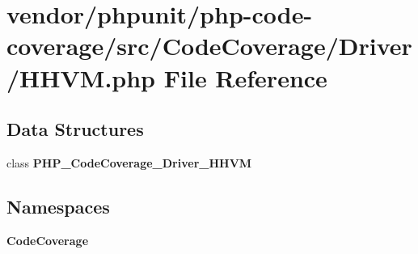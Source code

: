 \section{vendor/phpunit/php-\/code-\/coverage/src/\+Code\+Coverage/\+Driver/\+H\+H\+V\+M.php File Reference}
\label{_h_h_v_m_8php}
\subsection*{Data Structures}
\begin{DoxyCompactItemize}
\item 
class {\bf P\+H\+P\+\_\+\+Code\+Coverage\+\_\+\+Driver\+\_\+\+H\+H\+V\+M}
\end{DoxyCompactItemize}
\subsection*{Namespaces}
\begin{DoxyCompactItemize}
\item 
 {\bf Code\+Coverage}
\end{DoxyCompactItemize}
